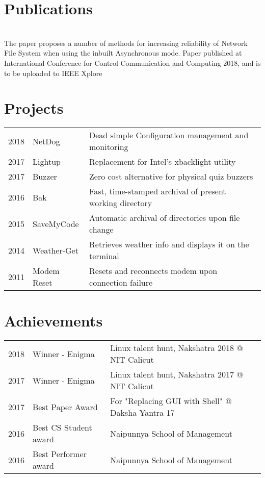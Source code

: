\documentclass[]{resume_karuvally_openfont}
\begin{document}
\begin{minipage}[t]{0.66\textwidth}

\section{Publications}
 \\
The paper proposes a number of methods for increasing reliability of Network
File System when using the inbuilt Asynchronous mode. Paper published at
International Conference for Control Communication and Computing 2018, and is
to be uploaded to IEEE Xplore
\sectionsep


\section{Projects} 
\begin{tabular}{rll}
2018    & NetDog    & Dead simple Configuration management and monitoring\\
2017    & Lightup   & Replacement for Intel's xbacklight utility\\
2017    & Buzzer    & Zero cost alternative for physical quiz buzzers\\
2016    & Bak       & Fast, time-stamped archival of present working directory\\
2015    & SaveMyCode& Automatic archival of directories upon file change\\
2014    & Weather-Get& Retrieves weather info and displays it on the terminal\\
2011    & Modem Reset& Resets and reconnects modem upon connection failure\\
\end{tabular}
\sectionsep


\section{Achievements} 
\begin{tabular}{rll}
2018    & Winner - Enigma   & Linux talent hunt, Nakshatra 2018 @ NIT Calicut\\
2017    & Winner - Enigma   & Linux talent hunt, Nakshatra 2017 @ NIT Calicut\\
2017    & Best Paper Award  & For "Replacing GUI with Shell" @ Daksha Yantra 17\\
2016    & Best CS Student award& Naipunnya School of Management\\
2016    & Best Performer award& Naipunnya School of Management\\
\end{tabular}
\sectionsep

\end{minipage} 
\end{document}
